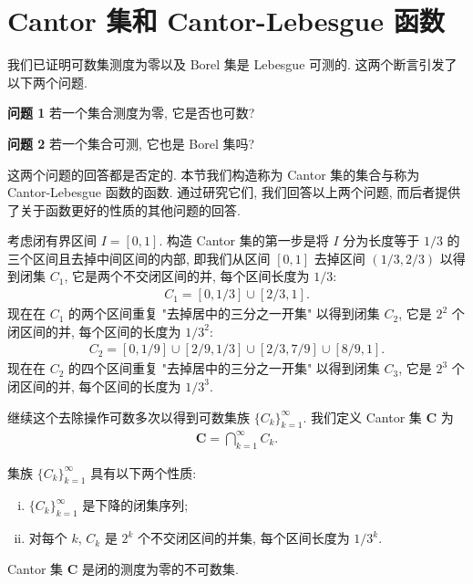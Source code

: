 \documentclass[../../main.tex]{subfiles}
\begin{document}
\section{Cantor 集和 Cantor-Lebesgue 函数}\label{section:ch02-Cantor}

我们已证明可数集测度为零以及 Borel 集是 Lebesgue 可测的. 这两个断言引发了以下两个问题.

\textbf{问题 1} 若一个集合测度为零, 它是否也可数?

\textbf{问题 2} 若一个集合可测, 它也是 Borel 集吗?

这两个问题的回答都是否定的. 本节我们构造称为 Cantor 集的集合与称为 Cantor-Lebesgue 函数的函数. 通过研究它们, 我们回答以上两个问题, 而后者提供了关于函数更好的性质的其他问题的回答.

考虑闭有界区间 $I=[0,1]$. 构造 Cantor 集的第一步是将 $I$ 分为长度等于 $1/3$ 的三个区间且去掉中间区间的内部, 即我们从区间 $[0,1]$ 去掉区间 $(1/3,2/3)$ 以得到闭集 $C_{1}$, 它是两个不交闭区间的并, 每个区间长度为 $1/3$:
\begin{align*}
C_{1}=[0,1/3]\cup[2/3,1].
\end{align*}
现在在 $C_{1}$ 的两个区间重复 "去掉居中的三分之一开集" 以得到闭集 $C_{2}$, 它是 $2^{2}$ 个闭区间的并, 每个区间的长度为 $1/3^{2}$:
\begin{align*}
C_{2}=[0,1/9]\cup[2/9,1/3]\cup[2/3,7/9]\cup[8/9,1].
\end{align*}
现在在 $C_{2}$ 的四个区间重复 "去掉居中的三分之一开集" 以得到闭集 $C_{3}$, 它是 $2^{3}$ 个闭区间的并, 每个区间的长度为 $1/3^{3}$.

继续这个去除操作可数多次以得到可数集族 $\{C_{k}\}_{k=1}^{\infty}$. 我们定义 Cantor 集 $\mathbf{C}$ 为
\begin{align*}
\mathbf{C}=\bigcap_{k=1}^{\infty}C_{k}.
\end{align*}

集族 $\{C_{k}\}_{k=1}^{\infty}$ 具有以下两个性质:
\begin{enumerate}[(i)]
\item $\{C_{k}\}_{k=1}^{\infty}$ 是下降的闭集序列;
\item 对每个 $k$, $C_{k}$ 是 $2^{k}$ 个不交闭区间的并集, 每个区间长度为 $1/3^{k}$.
\end{enumerate}

\begin{proposition}\label{proposition:ch02-Cantor零测}
Cantor 集 $\mathbf{C}$ 是闭的测度为零的不可数集.
\end{proposition}
\end{document}
